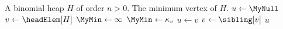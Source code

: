 
\begin{algorithmic}[1]
\Require A binomial heap $H$ of order $n > 0$.
\Ensure The minimum vertex of $H$.
\State $u \gets \MyNull$
\State $v \gets \headElem[H]$
\State $\MyMin \gets \infty$
    \State $\MyMin \gets \kappa_v$
    \State $u \gets v$
  \EndIf
  \State $v \gets \sibling[v]$
\EndWhile
\State \Return $u$
\end{algorithmic}
